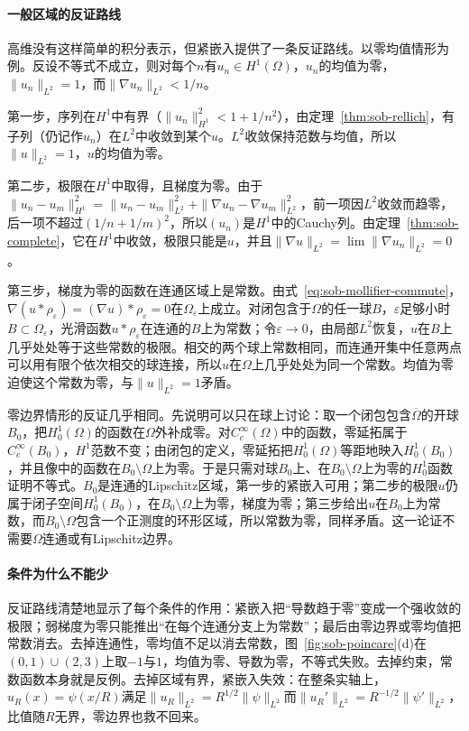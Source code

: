 \paragraph{一般区域的反证路线}
高维没有这样简单的积分表示，但紧嵌入提供了一条反证路线。以零均值情形为例。反设不等式不成立，则对每个$n$有$u_n\in H^1(\Omega)$，$u_n$的均值为零，$\|u_n\|_{L^2}=1$，而$\|\nabla u_n\|_{L^2}<1/n$。

第一步，序列在$H^1$中有界（$\|u_n\|_{H^1}^2<1+1/n^2$），由定理~\ref{thm:sob-rellich}，有子列（仍记作$u_n$）在$L^2$中收敛到某个$u$。$L^2$收敛保持范数与均值，所以$\|u\|_{L^2}=1$，$u$的均值为零。

第二步，极限在$H^1$中取得，且梯度为零。由于$\|u_n-u_m\|_{H^1}^2=\|u_n-u_m\|_{L^2}^2+\|\nabla u_n-\nabla u_m\|_{L^2}^2$，前一项因$L^2$收敛而趋零，后一项不超过$(1/n+1/m)^2$，所以$(u_n)$是$H^1$中的Cauchy列。由定理~\ref{thm:sob-complete}，它在$H^1$中收敛，极限只能是$u$，并且$\|\nabla u\|_{L^2}=\lim\|\nabla u_n\|_{L^2}=0$。

第三步，梯度为零的函数在连通区域上是常数。由式~\eqref{eq:sob-mollifier-commute}，$\nabla(u*\rho_\varepsilon)=(\nabla u)*\rho_\varepsilon=0$在$\Omega_\varepsilon$上成立。对闭包含于$\Omega$的任一球$B$，$\varepsilon$足够小时$B\subset\Omega_\varepsilon$，光滑函数$u*\rho_\varepsilon$在连通的$B$上为常数；令$\varepsilon\to0$，由局部$L^2$恢复，$u$在$B$上几乎处处等于这些常数的极限。相交的两个球上常数相同，而连通开集中任意两点可以用有限个依次相交的球连接，所以$u$在$\Omega$上几乎处处为同一个常数。均值为零迫使这个常数为零，与$\|u\|_{L^2}=1$矛盾。

零边界情形的反证几乎相同。先说明可以只在球上讨论：取一个闭包包含$\overline\Omega$的开球$B_0$，把$H_0^1(\Omega)$的函数在$\Omega$外补成零。对$C_c^\infty(\Omega)$中的函数，零延拓属于$C_c^\infty(B_0)$，$H^1$范数不变；由闭包的定义，零延拓把$H_0^1(\Omega)$等距地映入$H_0^1(B_0)$，并且像中的函数在$B_0\setminus\Omega$上为零。于是只需对球$B_0$上、在$B_0\setminus\Omega$上为零的$H_0^1$函数证明不等式。$B_0$是连通的Lipschitz区域，第一步的紧嵌入可用；第二步的极限$u$仍属于闭子空间$H_0^1(B_0)$，在$B_0\setminus\Omega$上为零，梯度为零；第三步给出$u$在$B_0$上为常数，而$B_0\setminus\Omega$包含一个正测度的环形区域，所以常数为零，同样矛盾。这一论证不需要$\Omega$连通或有Lipschitz边界。

\paragraph{条件为什么不能少}
反证路线清楚地显示了每个条件的作用：紧嵌入把“导数趋于零”变成一个强收敛的极限；弱梯度为零只能推出“在每个连通分支上为常数”；最后由零边界或零均值把常数消去。去掉连通性，零均值不足以消去常数，图~\ref{fig:sob-poincare}(d)在$(0,1)\cup(2,3)$上取$-1$与$1$，均值为零、导数为零，不等式失败。去掉约束，常数函数本身就是反例。去掉区域有界，紧嵌入失效：在整条实轴上，$u_R(x)=\psi(x/R)$满足$\|u_R\|_{L^2}=R^{1/2}\|\psi\|_{L^2}$而$\|u_R'\|_{L^2}=R^{-1/2}\|\psi'\|_{L^2}$，比值随$R$无界，零边界也救不回来。
